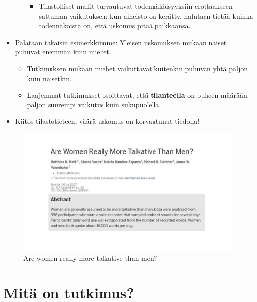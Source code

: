 \documentclass[
]{book}
\providecommand{\tightlist}{%
  \setlength{\itemsep}{0pt}\setlength{\parskip}{0pt}}
\begin{document}
\begin{eblock}{}
\begin{itemize}
\begin{itemize}
    \begin{itemize}
    \tightlist
    \item
      Tilastolliset mallit turvautuvat todennäköisyyksiin erottaakseen sattuman vaikutuksen: kun aineisto on kerätty, halutaan tietää kuinka todennäkoistä on, että uskomus pitää paikkaansa.
    \end{itemize}
  \end{itemize}
\item
  Palataan takaisin esimerkkiimme: Yleisen uskomuksen mukaan naiset puhuvat enemmän kuin miehet.

  \begin{itemize}
  \tightlist
  \item
    Tutkimuksen mukaan miehet vaikuttavat kuitenkin puhuvan yhtä paljon kuin naisetkin.
  \item
    Laajemmat tutkimukset osoittavat, että \textbf{tilanteella} on puheen määrään paljon suurempi vaikutus kuin sukupuolella.
  \end{itemize}
\item
  Kiitos tilastotieteen, väärä uskomus on korvautunut tiedolla!
\end{itemize}

\end{eblock}

\FloatBarrier
\begin{figure}

{\centering \includegraphics[width=1\linewidth]{images/Are-women-really-more-talkative} 

}

\caption{Are women really more talkative than men?}\label{fig:talkative}
\end{figure}

\FloatBarrier

\hypertarget{alaluku24}{%
\section{Mitä on tutkimus?}\label{alaluku24}}
\end{document}
